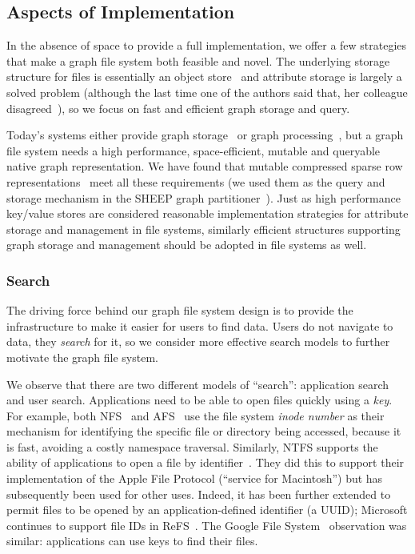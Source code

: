 \subsection{Aspects of Implementation}

In the absence of space to provide a full implementation, we offer a few
strategies that make a graph file system both feasible and novel.
The underlying storage structure for files is essentially an object store~\cite{factor2005object} and
attribute storage is largely a solved problem
(although the last time
one of the authors said that, her colleague disagreed~\cite{mao2012cache}), so we
focus on fast and efficient graph storage and query.

Today's systems either provide graph storage~\cite{rudolf2013graph,webber2018programmatic,microsoft:cosmosdb}
or graph processing~\cite{shun2013ligra,gonzalez2014graphx,malewicz2010pregel,salihoglu2013gps,nguyen2013lightweight,low2014graphlab,kyrola2012graphchi},
but a graph file system needs a high performance, space-efficient, mutable and queryable
native graph representation.
We have found that mutable compressed sparse row representations~\cite{macko2015llama}
meet all these requirements (we used them as the query and storage mechanism in the
SHEEP graph partitioner~\cite{margo2015scalable}).
Just as high performance key/value stores are considered reasonable implementation
strategies for attribute storage and management in file systems, similarly efficient
structures supporting graph storage and management should be adopted in file systems
as well.

\subsubsection{Search}\label{hotos19:search}

The driving force behind our graph file system design is to provide the
infrastructure to make it easier for users to find data.
Users do not navigate to data, they \textit{search} for it, so we
consider more effective search models to further
motivate the graph file system.

We observe that there are two different models of ``search'': application
search and user search.
Applications need to be able to open files quickly
using a \textit{key}. For example, both NFS~\cite{sandberg1986sun}
and AFS~\cite{sidebotham1986volumes} use the file system \textit{inode number} as their
mechanism for identifying the specific file or directory being accessed,
because it is fast, avoiding a costly namespace traversal.
Similarly, NTFS supports the ability of applications to open a file by
identifier~\cite{sreenivas2011bypass}.
They did this to support their implementation
of the Apple File Protocol (``service for Macintosh'') but has subsequently been used
for other uses. Indeed, it has been further extended to permit files to be opened by an
application-defined identifier (a UUID); Microsoft continues to support file IDs in
ReFS~\cite{microsoft:refs:features}. The Google File System~\cite{Ghemawat2003}
observation was similar: applications can use keys to find their files.

